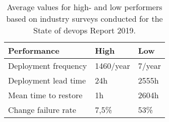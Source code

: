 \documentclass[../main.tex]{subfiles}
\begin{document}
    \begin{table}[h]
        \centering
        \begin{tabular}{ l  l  l }
            \toprule
            Performance & \textbf{High} & \textbf{Low} \\ \midrule
            Deployment frequency & 1460/year & 7/year \\ \midrule
            Deployment lead time & 24h & 2555h \\ \midrule
            Mean time to restore & 1h & 2604h \\ \midrule
            Change failure rate & 7,5\% & 53\% \\
            \bottomrule
        \end{tabular}
        \captionsetup{justification=centering}
        \caption{
            Average values for high- and low performers based on industry surveys conducted for the State of \gls{devops} Report 2019.\cite{state_of_devops_19}
        }
        \label{tab:state_devops}
    \end{table}
\end{document}
